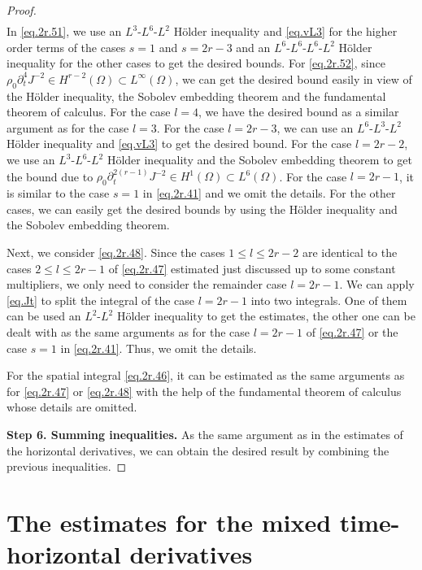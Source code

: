\documentclass[12pt,twoside,reqno]{amsart}
\numberwithin{equation}{section}
\theoremstyle{definition}
\theoremstyle{remark}
\begin{document}
\begin{proof}
\begin{align}
\end{align}
In \eqref{eq.2r.51}, we use an $L^3$-$L^6$-$L^2$ H\"older inequality and \eqref{eq.vL3} for the higher order terms of the cases $s=1$ and $s=2r-3$ and  an $L^6$-$L^6$-$L^6$-$L^2$ H\"older inequality for the other cases to get the desired bounds. For \eqref{eq.2r.52}, since ${\rho_0} {\partial}_t^4 J^{-2}\in H^{r-2}(\Omega)\subset L^\infty(\Omega)$, we can get the desired bound easily in view of the H\"older inequality, the Sobolev embedding theorem and the fundamental theorem of calculus.
For the case $l=4$, we have the desired bound as a similar argument as for the case $l=3$. For the case $l=2r-3$, we can use an $L^6$-$L^3$-$L^2$ H\"older inequality and \eqref{eq.vL3} to get the desired bound. For the case $l=2r-2$, we use an $L^3$-$L^6$-$L^2$ H\"older inequality and the Sobolev embedding theorem to get the bound due to ${\rho_0} {\partial}_t^{2(r-1)} J^{-2}\in H^1(\Omega)\subset L^6(\Omega)$. For the case $l=2r-1$, it is similar to the case $s=1$ in \eqref{eq.2r.41} and we omit the details. For the other cases, we can easily get the desired bounds by using the H\"older inequality and the Sobolev embedding theorem.

Next, we consider \eqref{eq.2r.48}. Since the cases $1{\leqslant} l{\leqslant} 2r-2$ are identical to the cases $2{\leqslant} l{\leqslant} 2r-1$ of \eqref{eq.2r.47} estimated just discussed up to some constant multipliers, we only need to consider the remainder case $l=2r-1$. We can apply \eqref{eq.Jt} to split the integral of the case $l=2r-1$ into two integrals. One of them can be used an $L^2$-$L^2$ H\"older inequality to get the estimates, the other one can be dealt with as the same arguments as for the case $l=2r-1$ of \eqref{eq.2r.47} or the case $s=1$ in \eqref{eq.2r.41}. Thus, we omit the details.

For the spatial integral \eqref{eq.2r.46}, it can be estimated as the same arguments as for \eqref{eq.2r.47} or \eqref{eq.2r.48} with the help of the fundamental theorem of calculus whose details are omitted.

\textbf{Step 6. Summing inequalities.} As the same argument as in the estimates of the horizontal derivatives, we can obtain the desired result by combining the previous inequalities.
\end{proof}

\section{The estimates for the mixed time-horizontal derivatives}\label{sec.mix}
\end{document}

